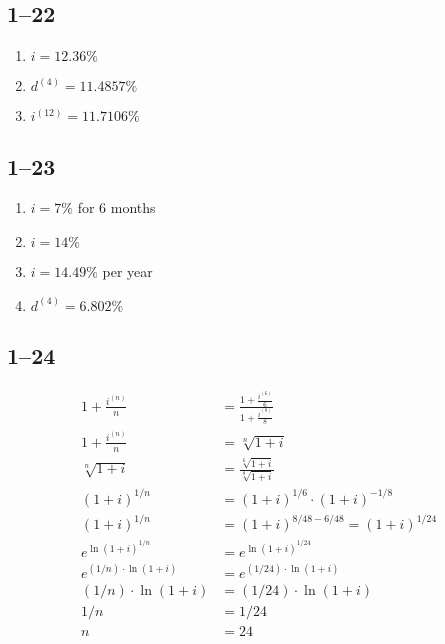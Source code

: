 \documentclass[a4paper, 12pt, reqno]{amsart}
\numberwithin{equation}{section}
\begin{document}
\subsection*{1--22}

\begin{enumerate}[label=(\alph*)]
    \item $i = 12.36\%$
    \item $d^{(4)} = 11.4857\%$
    \item $i^{(12)} = 11.7106\%$
\end{enumerate}

\subsection*{1--23}

\begin{enumerate}[label=(\alph*)]
    \item $i = 7\%$ for 6 months
    \item $i = 14\%$
    \item $i = 14.49\%$ per year
    \item $d^{(4)} = 6.802\%$
\end{enumerate}

\subsection*{1--24}

\begin{equation}\nonumber
    \begin{aligned}
        1 + \frac{i^{(n)}}{n} &= \frac{1 + \frac{i^{(6)}}{6}}{1
            + \frac{i^{(8)}}{8}}                                \\
        1 + \frac{i^{(n)}}{n} &= \sqrt[n]{1+i}                  \\
        \sqrt[n]{1+i} &= \frac{\sqrt[6]{1+i}}{\sqrt[8]{1+i}}    \\
        (1+i)^{1/n} &= (1+i)^{1/6} \cdot (1+i)^{-1/8}           \\
        (1+i)^{1/n} &= (1+i)^{8/48-6/48} = (1+i)^{1/24}         \\
        e^{\ln{(1+i)^{1/n}}} &= e^{\ln{(1+i)^{1/24}}}           \\
        e^{(1/n) \cdot \ln{(1+i)}} &= e^{(1/24) \cdot \ln{(1+i)}}\\
        (1/n) \cdot \ln{(1+i)} &= (1/24) \cdot \ln{(1+i)}       \\
        1/n &= 1/24 \\
        n &= 24
    \end{aligned}
\end{equation}
\end{document}

